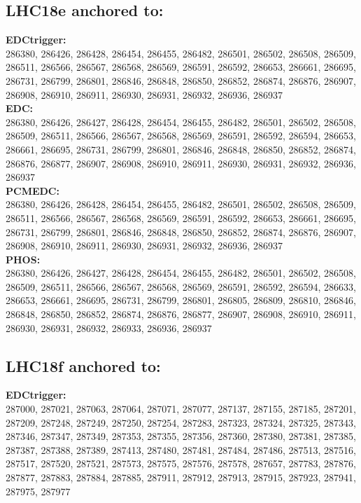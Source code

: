  \subsection{LHC18e anchored to:  }

  \textbf{EDCtrigger:}\\
 286380, 286426, 286428, 286454, 286455, 286482, 286501, 286502, 286508, 286509, 286511, 286566, 286567, 286568, 286569, 286591, 286592, 286653, 286661, 286695, 286731, 286799, 286801, 286846, 286848, 286850, 286852, 286874, 286876, 286907, 286908, 286910, 286911, 286930, 286931, 286932, 286936, 286937 \\

 \textbf{EDC:}\\
 286380, 286426, 286427, 286428, 286454, 286455, 286482, 286501, 286502, 286508, 286509, 286511, 286566, 286567, 286568, 286569, 286591, 286592, 286594, 286653, 286661, 286695, 286731, 286799, 286801, 286846, 286848, 286850, 286852, 286874, 286876, 286877, 286907, 286908, 286910, 286911, 286930, 286931, 286932, 286936, 286937 \\


 \textbf{PCMEDC:}\\
 286380, 286426, 286428, 286454, 286455, 286482, 286501, 286502, 286508, 286509, 286511, 286566, 286567, 286568, 286569, 286591, 286592, 286653, 286661, 286695, 286731, 286799, 286801, 286846, 286848, 286850, 286852, 286874, 286876, 286907, 286908, 286910, 286911, 286930, 286931, 286932, 286936, 286937 \\

 \textbf{PHOS:}\\
286380, 286426, 286427, 286428, 286454, 286455, 286482, 286501, 286502, 286508, 286509, 286511, 286566, 286567, 286568, 286569, 286591, 286592, 286594, 286633, 286653, 286661, 286695, 286731, 286799, 286801, 286805, 286809, 286810, 286846, 286848, 286850, 286852, 286874, 286876, 286877, 286907, 286908, 286910, 286911, 286930, 286931, 286932, 286933, 286936, 286937\\

 \subsection{LHC18f anchored to:  }

	\textbf{EDCtrigger:}\\
	287000, 287021, 287063, 287064, 287071, 287077, 287137, 287155, 287185, 287201, 287209, 287248, 287249, 287250, 287254, 287283, 287323, 287324, 287325, 287343, 287346, 287347, 287349, 287353, 287355, 287356, 287360, 287380, 287381, 287385, 287387, 287388, 287389, 287413, 287480, 287481, 287484, 287486, 287513, 287516, 287517, 287520, 287521, 287573, 287575, 287576, 287578, 287657, 287783, 287876, 287877, 287883, 287884, 287885, 287911, 287912, 287913, 287915, 287923, 287941, 287975, 287977 \\

